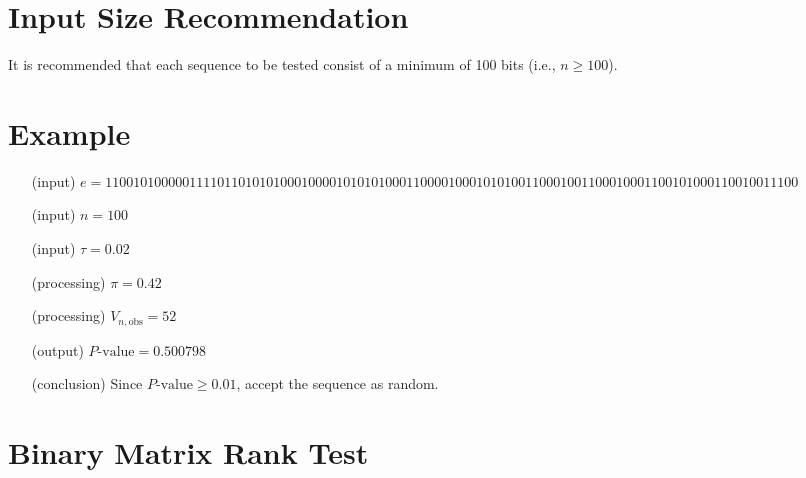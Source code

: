 \documentclass[12pt,openany]{book}
\theoremstyle{definition}
\begin{document}
	\section*{Input Size Recommendation}
	It is recommended that each sequence to be tested consist of a minimum of 100 bits (i.e., \( n \geq 100 \)).
	
	\section*{Example}
	
	\begin{itemize}
		\item[(input)] \( e = 110010100000111101101010100010000101010100011000010001010100110001001100010001100101000110010011100 \)
		\item[(input)] \( n = 100 \)
		\item[(input)] \( \tau = 0.02 \)
		\item[(processing)] \( \pi = 0.42 \)
		\item[(processing)] \( V_{n,\text{obs}} = 52 \)
		\item[(output)] \( P\text{-value} = 0.500798 \)
		\item[(conclusion)] Since \( P\text{-value} \geq 0.01 \), accept the sequence as random.
	\end{itemize}
	
	\section{Binary Matrix Rank Test}
	
\end{document}
